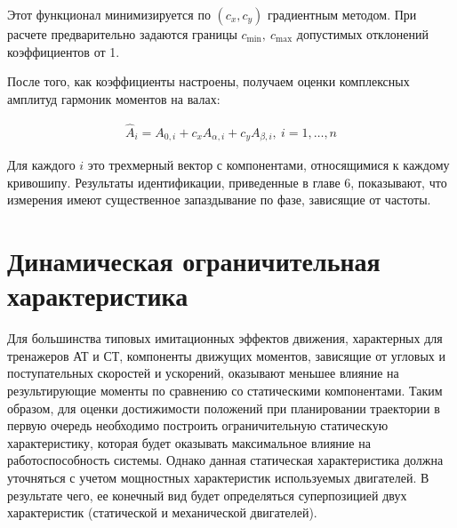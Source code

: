 Этот функционал минимизируется по $\left(c_x, c_y\right)$ градиентным методом. При расчете предварительно задаются границы $c_{\min},~c_{\max}$ допустимых отклонений коэффициентов от 1.

После того, как коэффициенты настроены, получаем оценки комплексных амплитуд гармоник моментов на валах:

\begin{equation}
\begin{aligned}
	\hat{A}_i = A_{0,i} + c_xA_{\alpha,i} + c_yA_{\beta,i},~i=1,\ldots,n
\end{aligned}
\end{equation}

Для каждого $i$ это трехмерный вектор с компонентами, относящимися к каждому кривошипу.
Результаты идентификации, приведенные в главе 6, показывают, что измерения имеют существенное запаздывание по фазе, зависящие от частоты.
%

\section{Динамическая ограничительная характеристика}

Для большинства типовых имитационных эффектов движения, характерных для тренажеров АТ и СТ, компоненты движущих моментов, зависящие от угловых и поступательных скоростей и ускорений, оказывают меньшее влияние на результирующие моменты по сравнению со статическими компонентами. Таким образом, для оценки достижимости положений при планировании траектории в первую очередь необходимо построить ограничительную статическую характеристику, которая будет оказывать максимальное влияние на работоспособность системы. Однако данная статическая характеристика должна уточняться с учетом мощностных характеристик используемых двигателей. В результате чего, ее конечный вид будет определяться суперпозицией двух характеристик (статической и механической двигателей).

